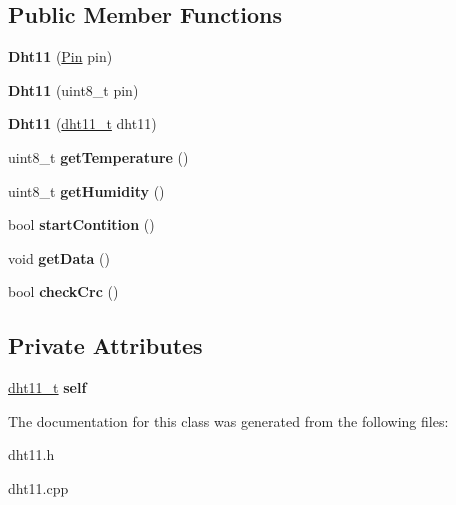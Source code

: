 \subsection*{Public Member Functions}
\begin{DoxyCompactItemize}
\item 
\mbox{\label{classDht11_a2d28c64f9f68880b48c787fe8be65e82}} 
{\bfseries Dht11} (\hyperlink{classPin}{Pin} pin)
\item 
\mbox{\label{classDht11_aca67610ae8e6e7a2f1df449295944b12}} 
{\bfseries Dht11} (uint8\+\_\+t pin)
\item 
\mbox{\label{classDht11_af3721521ff45bfbbe0a6b2ff3801d511}} 
{\bfseries Dht11} (\hyperlink{structdht11__t}{dht11\+\_\+t} dht11)
\item 
\mbox{\label{classDht11_a0959ad424980bf0386e132b66cbade5c}} 
uint8\+\_\+t {\bfseries get\+Temperature} ()
\item 
\mbox{\label{classDht11_a7edaa36ffa969932f7522a92d4ebbc21}} 
uint8\+\_\+t {\bfseries get\+Humidity} ()
\item 
\mbox{\label{classDht11_a2e70616b1c70d2dc6937e38c6cef27de}} 
bool {\bfseries start\+Contition} ()
\item 
\mbox{\label{classDht11_ad4cb519c841e97b5d1464e1fb66b332f}} 
void {\bfseries get\+Data} ()
\item 
\mbox{\label{classDht11_aded72886f2b8eed116d027ac47227046}} 
bool {\bfseries check\+Crc} ()
\end{DoxyCompactItemize}
\subsection*{Private Attributes}
\begin{DoxyCompactItemize}
\item 
\mbox{\label{classDht11_ad12915cbf961e219ef06dc617389ca51}} 
\hyperlink{structdht11__t}{dht11\+\_\+t} {\bfseries self}
\end{DoxyCompactItemize}


The documentation for this class was generated from the following files\+:\begin{DoxyCompactItemize}
\item 
dht11.\+h\item 
dht11.\+cpp\end{DoxyCompactItemize}
